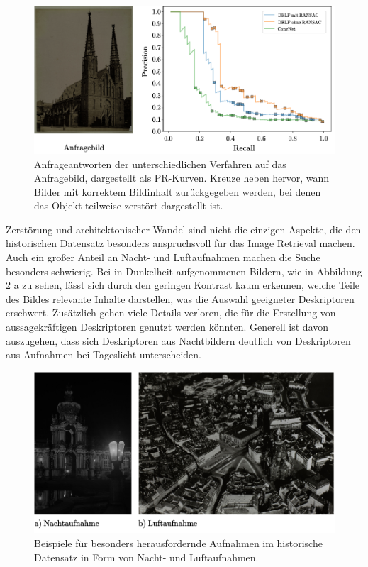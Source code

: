 \\
\begin{figure}[h]
\centering
\includegraphics[scale=1.0]{destruction_pr}
\caption{Anfrageantworten der unterschiedlichen Verfahren auf das Anfragebild, dargestellt als PR-Kurven. Kreuze heben hervor, wann Bilder mit korrektem Bildinhalt zurückgegeben werden, bei denen das Objekt teilweise zerstört dargestellt ist.}
\label{destruction_pr}
\end{figure}
Zerstörung und architektonischer Wandel sind nicht die einzigen Aspekte, die den historischen Datensatz besonders anspruchsvoll für das Image Retrieval machen. Auch ein großer Anteil an Nacht- und Luftaufnahmen machen die Suche besonders schwierig. Bei in Dunkelheit aufgenommenen Bildern, wie in Abbildung \ref{example_night_aerial} a zu sehen, lässt sich durch den geringen Kontrast kaum erkennen, welche Teile des Bildes relevante Inhalte darstellen, was die Auswahl geeigneter Deskriptoren erschwert. Zusätzlich gehen viele Details verloren, die für die Erstellung von aussagekräftigen Deskriptoren genutzt werden könnten. Generell ist davon auszugehen, dass sich Deskriptoren aus Nachtbildern deutlich von Deskriptoren aus Aufnahmen bei Tageslicht unterscheiden. 
\begin{figure}[h]
\centering
\includegraphics[scale=1.0]{example_night_aerial}
\caption{Beispiele für besonders herausfordernde Aufnahmen im historische Datensatz in Form von Nacht- und Luftaufnahmen.}
\label{example_night_aerial}
\end{figure}
